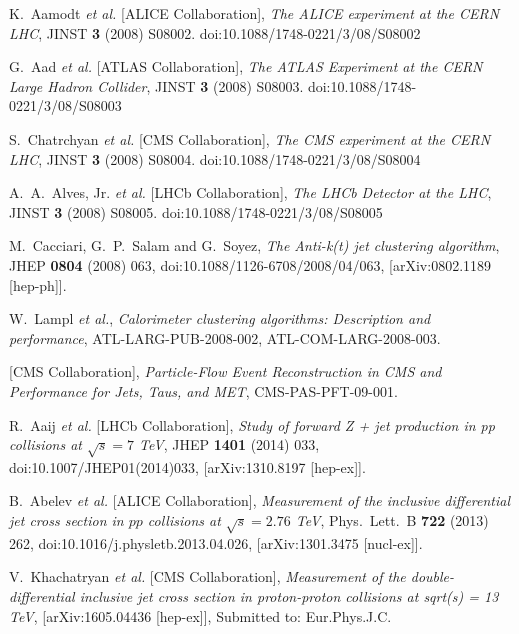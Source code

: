\documentclass{PoS}
\begin{document}
\begin{thebibliography}{99}

  K.~Aamodt {\it et al.} [ALICE Collaboration],
  {\it The ALICE experiment at the CERN LHC},
  JINST {\bf 3} (2008) S08002.
  doi:10.1088/1748-0221/3/08/S08002

  G.~Aad {\it et al.} [ATLAS Collaboration],
  {\it The ATLAS Experiment at the CERN Large Hadron Collider},
  JINST {\bf 3} (2008) S08003.
  doi:10.1088/1748-0221/3/08/S08003

  S.~Chatrchyan {\it et al.} [CMS Collaboration],
  {\it The CMS experiment at the CERN LHC},
  JINST {\bf 3} (2008) S08004.
  doi:10.1088/1748-0221/3/08/S08004

  A.~A.~Alves, Jr. {\it et al.} [LHCb Collaboration],
  {\it The LHCb Detector at the LHC},
  JINST {\bf 3} (2008) S08005.
  doi:10.1088/1748-0221/3/08/S08005

  M.~Cacciari, G.~P.~Salam and G.~Soyez,
  {\it The Anti-k(t) jet clustering algorithm},
  JHEP {\bf 0804} (2008) 063,
  doi:10.1088/1126-6708/2008/04/063,
  [arXiv:0802.1189 [hep-ph]].

  W.~Lampl {\it et al.}, 
   {\it Calorimeter clustering algorithms: Description and performance},
  ATL-LARG-PUB-2008-002, ATL-COM-LARG-2008-003.

  [CMS Collaboration],
  {\it Particle-Flow Event Reconstruction in CMS and Performance for Jets, Taus, and MET},
  CMS-PAS-PFT-09-001.

  R.~Aaij {\it et al.} [LHCb Collaboration],
  {\it Study of forward Z + jet production in pp collisions at $\sqrt{s} = 7$ TeV},
  JHEP {\bf 1401} (2014) 033,
  doi:10.1007/JHEP01(2014)033,
  [arXiv:1310.8197 [hep-ex]].

  B.~Abelev {\it et al.} [ALICE Collaboration],
  {\it Measurement of the inclusive differential jet cross section in $pp$ collisions at $\sqrt{s} = 2.76$ TeV},
  Phys.\ Lett.\ B {\bf 722} (2013) 262,
  doi:10.1016/j.physletb.2013.04.026,
  [arXiv:1301.3475 [nucl-ex]].

  V.~Khachatryan {\it et al.} [CMS Collaboration], 
   {\it Measurement of the double-differential inclusive jet cross section in proton-proton collisions at sqrt(s) = 13 TeV},
  [arXiv:1605.04436 [hep-ex]], 
   Submitted to: Eur.Phys.J.C.


\end{thebibliography}
\end{document}
